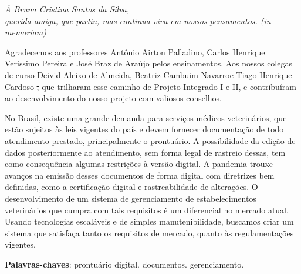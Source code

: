 \documentclass[
    12pt,               %
    openright,          %
    oneside,
    a4paper,            %
    BIBLATEX,           %
    TODO,               %
    english,            %
    brazil              %
    ]{ifsp-spo-inf-ctds}
\providecommand{\DIFadd}[1]{{\protect\color{blue}\uwave{#1}}} %
\providecommand{\DIFdel}[1]{{\protect\color{red}\sout{#1}}}                      %
\providecommand{\DIFaddbegin}{} %
\providecommand{\DIFaddend}{} %
\providecommand{\DIFdelbegin}{} %
\providecommand{\DIFdelend}{} %
\newcommand{\DIFscaledelfig}{0.5}
\newlength{\DIFdelgraphicswidth} %
\newlength{\DIFdelgraphicsheight} %
\newcommand{\DIFaddincludegraphics}[2][]{{\color{blue}\fbox{\DIFOincludegraphics[#1]{#2}}}} %
\newcommand{\DIFdelincludegraphics}[2][]{%
\sbox{\DIFdelgraphicsbox}{\DIFOincludegraphics[#1]{#2}}%
\settoboxwidth{\DIFdelgraphicswidth}{\DIFdelgraphicsbox} %
\settoboxtotalheight{\DIFdelgraphicsheight}{\DIFdelgraphicsbox} %
\scalebox{\DIFscaledelfig}{%
\parbox[b]{\DIFdelgraphicswidth}{\usebox{\DIFdelgraphicsbox}\\[-\baselineskip] \rule{\DIFdelgraphicswidth}{0em}}\llap{\resizebox{\DIFdelgraphicswidth}{\DIFdelgraphicsheight}{%
\setlength{\unitlength}{\DIFdelgraphicswidth}%
\begin{picture}(1,1)%
\thicklines\linethickness{2pt} %
{\color[rgb]{1,0,0}\put(0,0){\framebox(1,1){}}}%
{\color[rgb]{1,0,0}\put(0,0){\line( 1,1){1}}}%
{\color[rgb]{1,0,0}\put(0,1){\line(1,-1){1}}}%
\end{picture}%
}\hspace*{3pt}}} %
} %
\DeclareRobustCommand{\DIFaddbegin}{\DIFOaddbegin \let\includegraphics\DIFaddincludegraphics} %
\DeclareRobustCommand{\DIFaddend}{\DIFOaddend \let\includegraphics\DIFOincludegraphics} %
\DeclareRobustCommand{\DIFdelbegin}{\DIFOdelbegin \let\includegraphics\DIFdelincludegraphics} %
\DeclareRobustCommand{\DIFdelend}{\DIFOaddend \let\includegraphics\DIFOincludegraphics} %
\begin{document}
 
\frenchspacing 

\pretextual

\imprimircapa
\imprimirfolhaderosto

\begin{dedicatoria}
   \vspace*{\fill}
   \centering
   \noindent
   \textit{ À Bruna Cristina Santos da Silva,\\
   querida amiga, que partiu, mas continua viva em nossos pensamentos. (in memoriam)} 


   \vspace*{\fill}


\end{dedicatoria}
\begin{agradecimentos}
    Agradecemos aos professores Antônio Airton Palladino, Carlos Henrique Verissimo Pereira e José Braz de Araújo pelos ensinamentos.
    Aos nossos colegas de curso Deivid Aleixo de Almeida, Beatriz Cambuim Navarro\DIFdelbegin \DIFdel{e }\DIFdelend \DIFaddbegin \DIFadd{, }\DIFaddend Tiago Henrique Cardoso \DIFdelbegin \DIFdel{, }\DIFdelend \DIFaddbegin \DIFadd{e Duarte Nuno Vieira Ferreira }\DIFaddend que trilharam esse caminho de Projeto Integrado I e II, e contribuíram ao desenvolvimento do nosso projeto com valiosos conselhos.

    

\end{agradecimentos}



\setlength{\absparsep}{18pt} %
\begin{resumo}

No Brasil, existe uma grande demanda para serviços médicos veterinários, que estão sujeitos às leis vigentes do país e devem fornecer documentação de todo atendimento prestado, principalmente o prontuário. A possibilidade da edição de dados posteriormente ao atendimento, sem forma legal de rastreio dessas, tem como consequência algumas restrições à versão digital. A pandemia trouxe avanços na emissão desses documentos de forma digital com diretrizes bem definidas, como a certificação digital e rastreabilidade de alterações. O desenvolvimento de um sistema de gerenciamento de estabelecimentos veterinários que cumpra com tais requisitos é um diferencial no mercado atual. Usando tecnologias escaláveis e de simples manutenibilidade, buscamos criar um sistema que satisfaça tanto os requisitos de mercado, quanto às regulamentações vigentes. 

\textbf{Palavras-chaves}: prontuário digital. documentos. gerenciamento.
\end{resumo}
\end{document}
